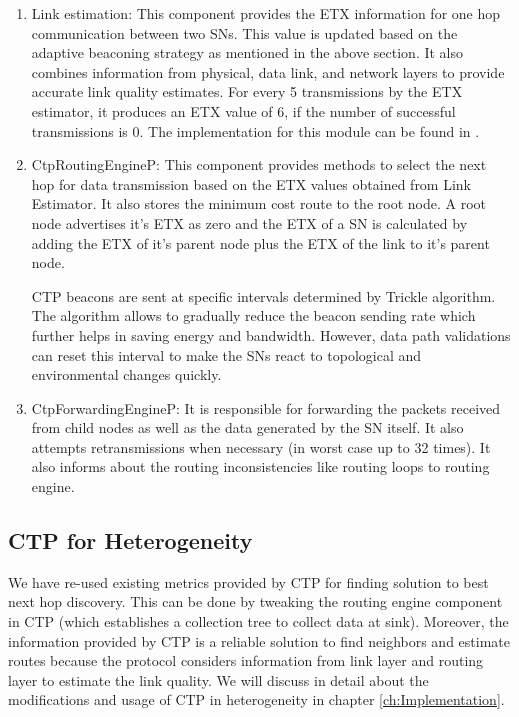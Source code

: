     \begin{enumerate}
        
        \item Link estimation: This component provides the \ac{ETX} information for one hop communication between two \acp{SN}. This value is updated based on the adaptive beaconing strategy as mentioned in the above section. It also combines information from physical, data link, and network layers to provide accurate link quality estimates. For every 5 transmissions by the \ac{ETX} estimator, it produces an \ac{ETX} value of 6, if the number of successful transmissions is 0. The implementation for this module can be found in \cite{ctp:linkEstimation}.
        
        \item CtpRoutingEngineP: This component provides methods to select the next hop for data transmission based on the \ac{ETX} values obtained from Link Estimator. It also stores the minimum cost route to the root node. A root node advertises it's \ac{ETX} as zero and the \ac{ETX} of a \ac{SN} is calculated by adding the \ac{ETX} of it's parent node plus the \ac{ETX} of the link to it's parent node. 
        
        \ac{CTP} beacons are sent at specific intervals determined by Trickle algorithm. The algorithm allows to gradually reduce the beacon sending rate which further helps in saving energy and bandwidth. However, data path validations can reset this interval to make the \acp{SN} react to topological and environmental changes quickly.
    
        
        \item CtpForwardingEngineP: It is responsible for forwarding the packets received from child nodes as well as the data generated by the \ac{SN} itself. It also attempts retransmissions when necessary (in worst case up to 32 times). It also informs about the routing inconsistencies like routing loops to routing engine. 
        
    \end{enumerate}
    
    
	\subsection*{CTP for Heterogeneity}
    
    \par
    We have re-used existing metrics provided by \ac{CTP} for finding solution to best next hop discovery. This can be done by tweaking the routing engine component in \ac{CTP} (which establishes a collection tree to collect data at sink). Moreover, the information provided by \ac{CTP} is a reliable solution to find neighbors and estimate routes because the protocol considers information from link layer and routing layer to estimate the link quality. We will discuss in detail about the modifications and usage of \ac{CTP} in heterogeneity in chapter \ref{ch:Implementation}.